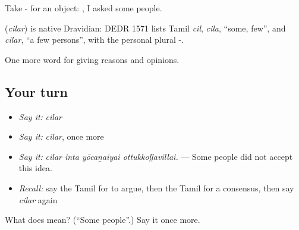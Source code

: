Take - for an object:  , I asked some people.

\begin{cousinweb}
\textbf{} (\emph{cilar}) is native Dravidian: DEDR 1571 lists Tamil \emph{cil}, \emph{cila}, \textquotedblleft{}some, few\textquotedblright{}, and \emph{cilar}, \textquotedblleft{}a few persons\textquotedblright{}, with the personal plural -.
\end{cousinweb}

\begin{grammarlens}[title={What you've built}]
One more word for giving reasons and opinions.
\end{grammarlens}

\subsection*{Your turn}
\begin{itemize}
\raggedright
  \item \emph{Say it:} \emph{cilar}
  \item \emph{Say it:} \emph{cilar}, once more
  \item \emph{Say it:} \emph{cilar inta yōcaṉaiyai ottukkoḷḷavillai.} — Some people did not accept this idea.
  \item \emph{Recall:} say the Tamil for to argue, then the Tamil for a consensus, then say \emph{cilar} again
\end{itemize}

\begin{tcolorbox}[breakable,colback=teal!4,colframe=teal!35!black,title={Before you move on}]
What does  mean? (\textquotedblleft{}Some people\textquotedblright{}.) Say it once more.
\end{tcolorbox}

